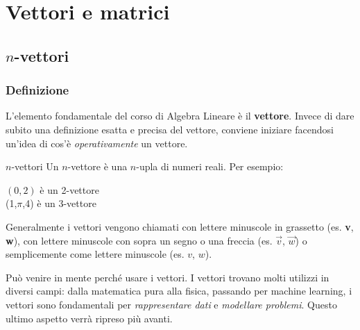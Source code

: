 \chapter{Vettori e matrici}
\section{$n$-vettori}
\subsection{Definizione}
L'elemento fondamentale del corso di Algebra Lineare è il \textbf{vettore}. Invece di dare subito una definizione esatta e precisa del vettore, conviene iniziare facendosi un'idea di cos'è \textit{operativamente} un vettore.
\begin{newdef}{$n$-vettori}
    Un $n$-vettore è una $n$-upla di numeri reali. Per esempio:
    \begin{center}
        $(0,2)$ è un 2-vettore \\
        (1,$\pi$,4) è un 3-vettore
    \end{center}
\end{newdef}
Generalmente i vettori vengono chiamati con lettere minuscole in grassetto (es. \textbf{v}, \textbf{w}), con lettere minuscole con sopra un segno o una freccia (es. $\vec v$, $\vec w$) o semplicemente come lettere minuscole (es. $v$, $w$).

Può venire in mente perché usare i vettori. I vettori trovano molti utilizzi in diversi campi: dalla matematica pura alla fisica, passando per machine learning, i vettori sono fondamentali per \textit{rappresentare dati} e \textit{modellare problemi}. Questo ultimo aspetto verrà ripreso più avanti.

